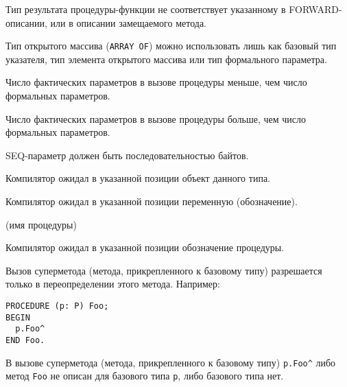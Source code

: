 Тип результата процедуры-функции не соответствует указанному в
FORWARD-описании, или в описании замещаемого метода.


Тип открытого массива (\verb'ARRAY OF') можно использовать лишь
как базовый тип указателя, тип элемента открытого массива или тип
формального параметра.


Число фактических параметров в вызове процедуры меньше, чем число
формальных параметров.


Число фактических параметров в вызове процедуры больше, чем число
формальных параметров.


SEQ-параметр должен быть последовательностью байтов.


Компилятор ожидал в указанной позиции объект данного типа.


Компилятор ожидал в указанной позиции переменную (обозначение).

(имя процедуры)

Компилятор ожидал в указанной позиции обозначение процедуры.


Вызов суперметода (метода, прикрепленного к базовому типу)
разрешается только в переопределении этого метода. Например:

\begin{verbatim}
PROCEDURE (p: P) Foo;
BEGIN
  p.Foo^
END Foo.
\end{verbatim}


В вызове суперметода (метода, прикрепленного к базовому типу)
\verb'p.Foo^' либо метод \verb'Foo' не описан для базового типа
\verb'p', либо базового типа нет.


